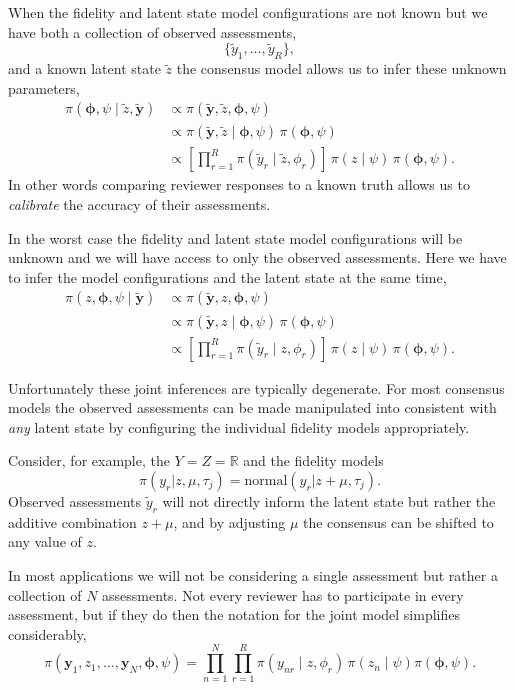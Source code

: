 \documentclass[
  letterpaper,
  DIV=11,
  numbers=noendperiod]{scrartcl}
\begin{document}
When the fidelity and latent state model configurations are not known
but we have both a collection of observed assessments, \[
\{ \tilde{y}_{1}, \ldots, \tilde{y}_{R} \},
\] and a known latent state \(\tilde{z}\) the consensus model allows us
to infer these unknown parameters, \begin{align*}
\pi( \boldsymbol{\phi}, \psi \mid \tilde{z}, \tilde{\mathbf{y}} )
&\propto
\pi( \tilde{\mathbf{y}}, \tilde{z}, \boldsymbol{\phi}, \psi )
\\
&\propto
\pi( \tilde{\mathbf{y}}, \tilde{z} \mid \boldsymbol{\phi}, \psi ) \,
\pi( \boldsymbol{\phi}, \psi )
\\
&\propto
\left[ \prod_{r = 1}^{R}
       \pi( \tilde{y}_{r} \mid \tilde{z}, \phi_{r}) \right] \,
\pi( z \mid \psi) \, \pi( \boldsymbol{\phi}, \psi ).
\end{align*} In other words comparing reviewer responses to a known
truth allows us to \emph{calibrate} the accuracy of their assessments.

In the worst case the fidelity and latent state model configurations
will be unknown and we will have access to only the observed
assessments. Here we have to infer the model configurations and the
latent state at the same time, \begin{align*}
\pi( z, \boldsymbol{\phi}, \psi \mid \tilde{\mathbf{y}} )
&\propto
\pi( \tilde{\mathbf{y}}, z, \boldsymbol{\phi}, \psi)
\\
&\propto
\pi( \tilde{\mathbf{y}}, z \mid \boldsymbol{\phi}, \psi ) \,
\pi( \boldsymbol{\phi}, \psi )
\\
&\propto
\left[ \prod_{r = 1}^{R} \pi( \tilde{y}_{r} \mid z, \phi_{r}) \right] \,
\pi( z \mid \psi) \, \pi( \boldsymbol{\phi}, \psi ).
\end{align*}

Unfortunately these joint inferences are typically degenerate. For most
consensus models the observed assessments can be made manipulated into
consistent with \emph{any} latent state by configuring the individual
fidelity models appropriately.

Consider, for example, the \(Y = Z = \mathbb{R}\) and the fidelity
models \[
\pi( y_{r} | z, \mu, \tau_{j} )
=
\text{normal}( y_{r} | z + \mu, \tau_{j} ).
\] Observed assessments \(\tilde{y}_{r}\) will not directly inform the
latent state but rather the additive combination \(z + \mu\), and by
adjusting \(\mu\) the consensus can be shifted to any value of \(z\).

In most applications we will not be considering a single assessment but
rather a collection of \(N\) assessments. Not every reviewer has to
participate in every assessment, but if they do then the notation for
the joint model simplifies considerably, \[
\pi(\mathbf{y}_{1}, z_{1}, \ldots, \mathbf{y}_{N},
    \boldsymbol{\phi}, \psi)
=
\prod_{n = 1}^{N}
\prod_{r = 1}^{R} \pi( y_{nr} \mid z, \phi_{r}) \, \pi( z_{n} \mid \psi)
\pi(\boldsymbol{\phi}, \psi).
\]
\end{document}
